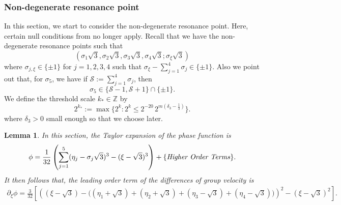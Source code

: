 \documentclass[reqno,english,11pt]{amsart}
\newtheorem{lemma}[theorem]{Lemma}
\theoremstyle{definition}
\numberwithin{equation}{section}
\begin{document}
\subsubsection{Non-degenerate resonance point}
In this section, we start to consider the non-degenerate resonance point. Here, certain null conditions from \cite{Morgan} no longer apply. 
Recall that we have the non-degenerate resonance points such that
$$(\sigma_1\sqrt{3},\sigma_2\sqrt{3},\sigma_3\sqrt{3},\sigma_4\sqrt{3};\sigma_{\xi}\sqrt{3})$$
where $\sigma_{j,\xi}\in \{\pm 1\}$ for $j=1,2,3,4$ such that $\sigma_\xi-\sum^4_{j=1}\sigma_j\in\{\pm 1\}$. Also we point out that, for $\sigma_5$, we have 
if $\mathcal{S}:=\sum_{j=1}^4\sigma_j$, then
$$
\sigma_5 \in \{\mathcal{S}-1, \mathcal{S}+1\}\cap\{\pm1\}.
$$
We define the threshold scale $k_*\in\mathbb{Z}$ by
\begin{equation}\label{eq:def_k_star_non_degenrate}
2^{k_*} := \max\Big\{2^k : 2^k \le 2^{-20}\,2^{m(\delta_3-\frac13)}\Big\}.
\end{equation}
where $\delta_3>0$ small enough so that we choose later.
\begin{lemma}\label{lem:taylor_non_degenerate_sum}
    In this section, the Taylor expansion of the phase function is 
    \begin{equation}\label{eq:non_degenerate_Taylor_expansion}
\phi= \frac{1}{32} \left( \sum_{j=1}^5 (\eta_j - \sigma_j\sqrt{3})^3 - (\xi - \sqrt{3})^3 \right) + \text{\{\emph{Higher Order Terms}\}}.
\end{equation}
It then follows that, the leading order term of the differences of group velocity is \begin{align}
    \partial_{\xi}\phi
=\frac{3}{32}\left[
\left(
(\xi-\sqrt{3})
-\Big((\eta_{1}+\sqrt{3})+(\eta_{2}+\sqrt{3})+(\eta_{3}-\sqrt{3})+(\eta_{4}-\sqrt{3})\Big)
\right)^{2}
-(\xi-\sqrt{3})^{2}
\right].
\end{align}
\end{lemma}
\end{document}
